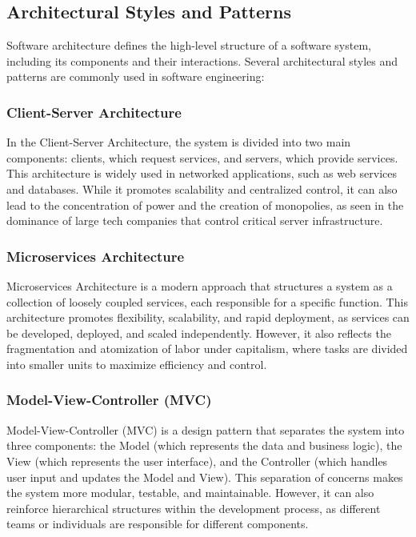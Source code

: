 \begin{refsection}
\begin{multicols}{2}
{\subsection{Architectural Styles and Patterns}

Software architecture defines the high-level structure of a software system, including its components and their interactions. Several architectural styles and patterns are commonly used in software engineering:

\subsubsection{Client-Server Architecture}

In the Client-Server Architecture, the system is divided into two main components: clients, which request services, and servers, which provide services. This architecture is widely used in networked applications, such as web services and databases. While it promotes scalability and centralized control, it can also lead to the concentration of power and the creation of monopolies, as seen in the dominance of large tech companies that control critical server infrastructure.

\subsubsection{Microservices Architecture}

Microservices Architecture is a modern approach that structures a system as a collection of loosely coupled services, each responsible for a specific function. This architecture promotes flexibility, scalability, and rapid deployment, as services can be developed, deployed, and scaled independently. However, it also reflects the fragmentation and atomization of labor under capitalism, where tasks are divided into smaller units to maximize efficiency and control.

\subsubsection{Model-View-Controller (MVC)}

Model-View-Controller (MVC) is a design pattern that separates the system into three components: the Model (which represents the data and business logic), the View (which represents the user interface), and the Controller (which handles user input and updates the Model and View). This separation of concerns makes the system more modular, testable, and maintainable. However, it can also reinforce hierarchical structures within the development process, as different teams or individuals are responsible for different components.

}
\end{multicols}
\end{refsection}
